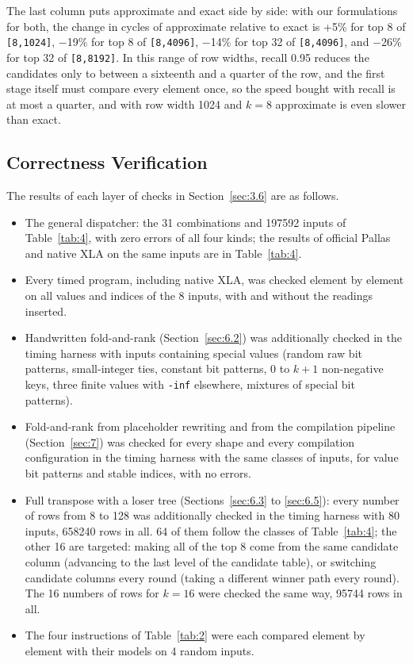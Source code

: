 \documentclass[sigconf,nonacm,balance=false]{acmart}
\newcommand{\code}[1]{\texttt{#1}}
\begin{document}
The last column puts approximate and exact side by side: with our formulations for both, the change in cycles of approximate relative to exact is +5\% for top 8 of \code{[8,\allowbreak{}1024]}, $-$19\% for top 8 of \code{[8,\allowbreak{}4096]}, $-$14\% for top 32 of \code{[8,\allowbreak{}4096]}, and $-$26\% for top 32 of \code{[8,\allowbreak{}8192]}. In this range of row widths, recall 0.95 reduces the candidates only to between a sixteenth and a quarter of the row, and the first stage itself must compare every element once, so the speed bought with recall is at most a quarter, and with row width 1024 and $k = 8$ approximate is even slower than exact.

\subsection{Correctness Verification}
\label{sec:8.4}

The results of each layer of checks in Section~\ref{sec:3.6} are as follows.

\begin{itemize}
\item The general dispatcher: the 31 combinations and 197592 inputs of Table~\ref{tab:4}, with zero errors of all four kinds; the results of official Pallas and native XLA on the same inputs are in Table~\ref{tab:4}.
\item Every timed program, including native XLA, was checked element by element on all values and indices of the 8 inputs, with and without the readings inserted.
\item Handwritten fold-and-rank (Section~\ref{sec:6.2}) was additionally checked in the timing harness with inputs containing special values (random raw bit patterns, small-integer ties, constant bit patterns, 0 to $k + 1$ non-negative keys, three finite values with \code{-inf} elsewhere, mixtures of special bit patterns).
\item Fold-and-rank from placeholder rewriting and from the compilation pipeline (Section~\ref{sec:7}) was checked for every shape and every compilation configuration in the timing harness with the same classes of inputs, for value bit patterns and stable indices, with no errors.
\item Full transpose with a loser tree (Sections~\ref{sec:6.3} to \ref{sec:6.5}): every number of rows from 8 to 128 was additionally checked in the timing harness with 80 inputs, 658240 rows in all. 64 of them follow the classes of Table~\ref{tab:4}; the other 16 are targeted: making all of the top 8 come from the same candidate column (advancing to the last level of the candidate table), or switching candidate columns every round (taking a different winner path every round). The 16 numbers of rows for $k = 16$ were checked the same way, 95744 rows in all.
\item The four instructions of Table~\ref{tab:2} were each compared element by element with their models on 4 random inputs.
\end{itemize}
\end{document}
